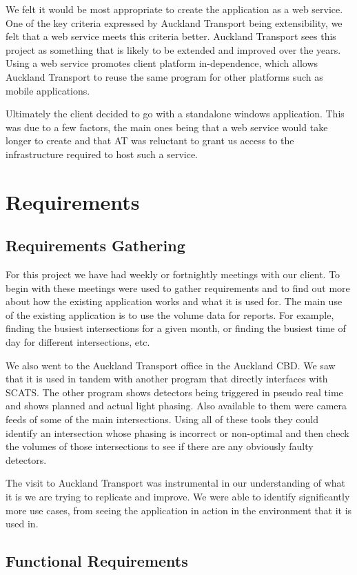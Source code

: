 \documentclass{article}
\begin{document}
We felt it would be most appropriate to create the
application as a web service. One of the key criteria expressed
by Auckland Transport being extensibility, we felt that a web
service meets this criteria better. Auckland Transport sees this
project as something that is likely to be extended and
improved over the years. Using a web service promotes client
platform in-dependence, which allows Auckland Transport to
reuse the same program for other platforms such as mobile
applications.

Ultimately the client decided to go with a standalone
windows application. This was due to a few factors, the main
ones being that a web service would take longer to create and
that AT was reluctant to grant us access to the infrastructure
required to host such a service.

\section{Requirements}
\subsection{Requirements Gathering}
For this project we have had weekly or fortnightly
meetings with our client. To begin with these meetings were
used to gather requirements and to find out more about how
the existing application works and what it is used for.
The main use of the existing application is to use the
volume data for reports. For example, finding the busiest
intersections for a given month, or finding the busiest time of
day for different intersections, etc.

We also went to the Auckland Transport office in the
Auckland CBD. We saw that it is used in tandem with another
program that directly interfaces with SCATS. The other
program shows detectors being triggered in pseudo real time
and shows planned and actual light phasing. Also available to
them were camera feeds of some of the main intersections.
Using all of these tools they could identify an intersection
whose phasing is incorrect or non-optimal and then check the
volumes of those intersections to see if there are any obviously
faulty detectors.

The visit to Auckland Transport was instrumental in our
understanding of what it is we are trying to replicate and
improve. We were able to identify significantly more use
cases, from seeing the application in action in the environment
that it is used in.

\subsection{Functional Requirements}
\end{document}

